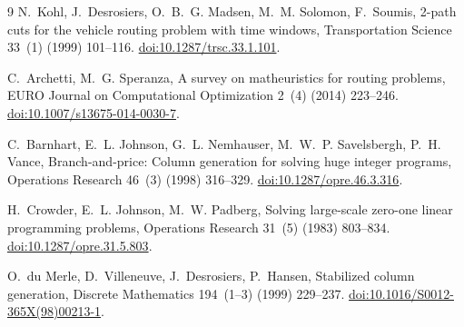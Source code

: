 \documentclass[11pt,a4paper]{article}
\begin{document}
\begin{thebibliography}{9}
N.~Kohl, J.~Desrosiers, O.~B.~G. Madsen, M.~M. Solomon, F.~Soumis,
2-path cuts for the vehicle routing problem with time windows,
Transportation Science 33~(1) (1999) 101--116.
\href{https://doi.org/10.1287/trsc.33.1.101}{doi:10.1287/trsc.33.1.101}.

C.~Archetti, M.~G. Speranza,
A survey on matheuristics for routing problems,
EURO Journal on Computational Optimization 2~(4) (2014) 223--246.
\href{https://doi.org/10.1007/s13675-014-0030-7}{doi:10.1007/s13675-014-0030-7}.

C.~Barnhart, E.~L. Johnson, G.~L. Nemhauser, M.~W.~P. Savelsbergh, P.~H. Vance,
Branch-and-price: Column generation for solving huge integer programs,
Operations Research 46~(3) (1998) 316--329.
\href{https://doi.org/10.1287/opre.46.3.316}{doi:10.1287/opre.46.3.316}.

H.~Crowder, E.~L. Johnson, M.~W. Padberg,
Solving large-scale zero-one linear programming problems,
Operations Research 31~(5) (1983) 803--834.
\href{https://doi.org/10.1287/opre.31.5.803}{doi:10.1287/opre.31.5.803}.

O.~du Merle, D.~Villeneuve, J.~Desrosiers, P.~Hansen,
Stabilized column generation,
Discrete Mathematics 194~(1--3) (1999) 229--237.
\href{https://doi.org/10.1016/S0012-365X(98)00213-1}{doi:10.1016/S0012-365X(98)00213-1}.

\end{thebibliography}
\end{document}
